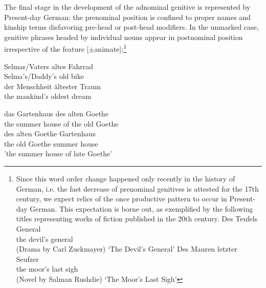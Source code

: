 \documentclass[output=paper
                ,modfonts
                ,nonflat
	        ,collection
	        ,collectionchapter
	        ,collectiontoclongg
 	        ,biblatex
                ,babelshorthands
                ,newtxmath
                ,draftmode
                ,colorlinks, citecolor=brown
]{./langsci/langscibook}
\begin{document}
The final stage in the development of the adnominal genitive is represented by Present-day German: the prenominal position is confined to proper names and kinship terms disfavoring pre-head or post-head modifiers. In the unmarked case, genitive phrases headed by individual nouns appear in postnominal position irrespective of the feature [$\pm$animate]:\footnote{Since this word order change happened only recently in the history of German, i.e. the fast decrease of prenominal genitives is attested for the 17th century, we expect relics of the once productive pattern to occur in Present-day German. This expectation is borne out, as exemplified by the following titles representing works of fiction published in the 20th century.
\eal
\ex
\gll Des Teufels General \\ the devil's general \\ \hfill (Drama by Carl Zuckmayer)
\glt `The Devil's General'
\ex
\gll Des Mauren letzter Seufzer \\ the moor's last sigh  \\ \hfill (Novel by Salman Rushdie)
\glt  `The Moor's Last Sigh'  
\zl
}

\eal
\ex
\gll Selmas/Vaters altes Fahrrad \\ Selma's/Daddy's old bike\\
\ex
\gll *der Menschheit ältester Traum \\ the mankind's oldest dream \\
\zl

\eal
\ex
\gll das Gartenhaus des alten Goethe \\ the {summer house} {of the} old Goethe \\
\ex 
\gll *des alten Goethe Gartenhaus \\ the old Goethe {summer house} \\
\glt 'the summer house of late Goethe'
\zl
\end{document}
